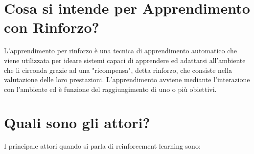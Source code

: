 \documentclass[\main/main.tex]{subfiles}
\begin{document}
\section{Cosa si intende per Apprendimento con Rinforzo?}
L'apprendimento per rinforzo è una tecnica di apprendimento automatico che viene utilizzata per ideare sistemi capaci di apprendere ed adattarsi all'ambiente che li circonda grazie ad una "ricompensa", detta rinforzo, che consiste nella valutazione delle loro prestazioni. L'apprendimento avviene mediante l'interazione con l'ambiente ed è funzione del raggiungimento di uno o più obiettivi.

\section{Quali sono gli attori?}
I principale attori quando si parla di reinforcement learning sono: 
\end{document}
